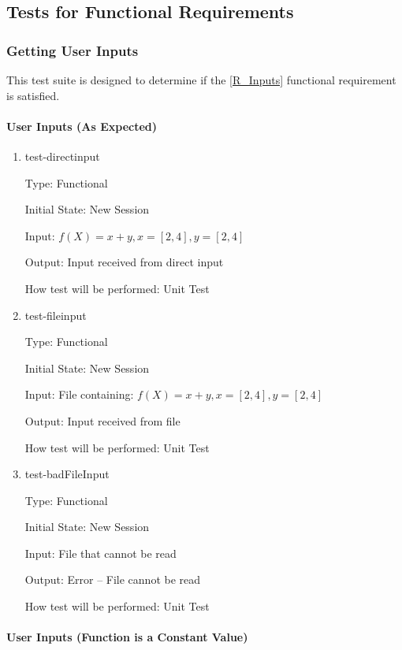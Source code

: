 \documentclass[12pt, titlepage]{article}
\begin{document}
\subsection{Tests for Functional Requirements}

\subsubsection{Getting User Inputs}
This test suite is designed to determine if the \ref{R_Inputs} functional 
requirement is satisfied.

\paragraph{User Inputs (As Expected)}

\begin{enumerate}
	
	\item{test-directinput}
	
	Type: Functional
	
	Initial State: New Session
	
	Input: $f(X) = x + y, x = [2,4], y = [2,4]$
	
	Output: Input received from direct input
	
	How test will be performed: Unit Test\\
	
	\item{test-fileinput}

	Type: Functional
	
	Initial State: New Session
	
	Input: File containing: $f(X) = x + y, x = [2,4], y = [2,4]$
	
	Output: Input received from file
	
	How test will be performed: Unit Test\\
	
	\item{test-badFileInput}
	
	Type: Functional
	
	Initial State: New Session
	
	Input: File that cannot be read
	
	Output: Error -- File cannot be read
	
	How test will be performed: Unit Test\\
\end{enumerate}
	
\paragraph{User Inputs (Function is a Constant Value)}
\end{document}
